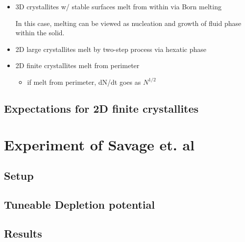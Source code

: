 \documentclass{umthesis}          %
\begin{document}
\begin{itemize}

\item 3D crystallites w/ stable surfaces melt from within via Born melting\\
\label{sec-2.1.1.1}

In this case, melting can be viewed as nucleation and growth of fluid phase within the solid.

\item 2D large crystallites melt by two-step process via hexatic phase\\
\label{sec-2.1.1.2}


\item 2D finite crystallites melt from perimeter\\
\label{sec-2.1.1.3}

\begin{itemize}

\item if melt from perimeter, dN/dt goes as $N^{1/2}$\\
\label{sec-2.1.1.3.1}

\end{itemize} %
\end{itemize} %
\subsection{Expectations for 2D finite crystallites}
\label{sec-2.1.2}

\section{Experiment of Savage et. al}
\label{sec-2.2}

\subsection{Setup}
\label{sec-2.2.1}

\subsection{Tuneable Depletion potential}
\label{sec-2.2.2}

\subsection{Results}
\label{sec-2.2.3}
\end{document}
